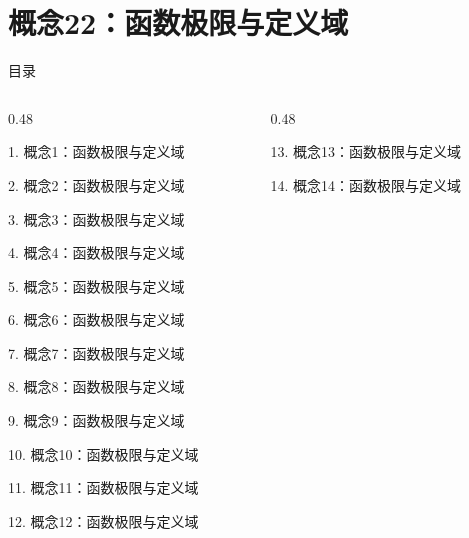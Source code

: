 \documentclass[aspectratio=169,10pt,fontset=fandol]{ctexbeamer}
\begin{document}
\section{概念22：函数极限与定义域}
\begin{frame}[t,fragile]{目录}
\small
\begin{columns}[T,onlytextwidth]
\begin{column}{0.48\textwidth}
{\color{black}\small 1. 概念1：函数极限与定义域\par}\vspace{0.22em}
{\color{black}\small 2. 概念2：函数极限与定义域\par}\vspace{0.22em}
{\color{black}\small 3. 概念3：函数极限与定义域\par}\vspace{0.22em}
{\color{black}\small 4. 概念4：函数极限与定义域\par}\vspace{0.22em}
{\color{black}\small 5. 概念5：函数极限与定义域\par}\vspace{0.22em}
{\color{black}\small 6. 概念6：函数极限与定义域\par}\vspace{0.22em}
{\color{black}\small 7. 概念7：函数极限与定义域\par}\vspace{0.22em}
{\color{black}\small 8. 概念8：函数极限与定义域\par}\vspace{0.22em}
{\color{black}\small 9. 概念9：函数极限与定义域\par}\vspace{0.22em}
{\color{black}\small 10. 概念10：函数极限与定义域\par}\vspace{0.22em}
{\color{black}\small 11. 概念11：函数极限与定义域\par}\vspace{0.22em}
{\color{black}\small 12. 概念12：函数极限与定义域\par}\vspace{0.22em}
\end{column}
\begin{column}{0.48\textwidth}
{\color{black}\small 13. 概念13：函数极限与定义域\par}\vspace{0.22em}
{\color{black}\small 14. 概念14：函数极限与定义域\par}\vspace{0.22em}

\end{column}
\end{columns}
\end{frame}
\end{document}
